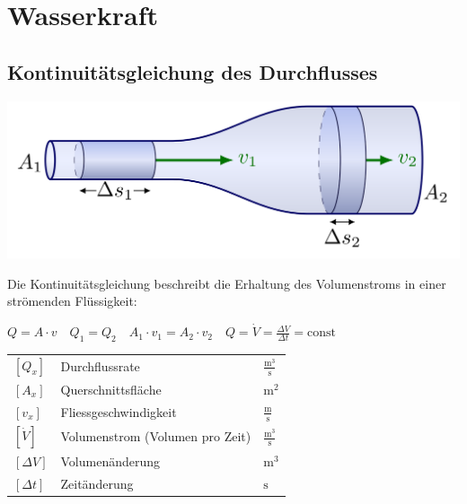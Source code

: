 \newpage
\section{Wasserkraft}


\subsection{Kontinuitätsgleichung des Durchflusses}
\begin{center}
    \includegraphics[width=0.9\columnwidth, align=c]{images/Kontinuitaet.png}
\end{center}

Die Kontinuitätsgleichung beschreibt die Erhaltung des Volumenstroms in einer strömenden Flüssigkeit:

\vspace{0.15cm}

$
\boxed{
    Q = A \cdot v 
} 
\quad
\boxed{
    Q_1 = Q_2 
} 
\quad
\boxed{
    A_1 \cdot v_1 = A_2 \cdot v_2
}
\quad
\boxed{
    Q = \dot{V} = \frac{\Delta V}{\Delta t} = \text{const} 
} 
$

\vspace{0.15cm}

\renewcommand{\arraystretch}{1.2} %
\begin{tabular}{@{} l p{6cm} l @{}}
    $[Q_x]$        & Durchflussrate                     \dotfill & $\mathrm{\frac{m^3}{s}}$ \\
    $[A_x]$        & Querschnittsfläche                 \dotfill & $\mathrm{m^2}$ \\
    $[v_x]$        & Fliessgeschwindigkeit              \dotfill & $\mathrm{\frac{m}{s}}$ \\
    $[\dot{V}]$    & Volumenstrom (Volumen pro Zeit)    \dotfill & $\mathrm{\frac{m^3}{s}}$ \\
    $[\Delta V]$   & Volumenänderung                    \dotfill & $\mathrm{m^3}$ \\
    $[\Delta t]$   & Zeitänderung                       \dotfill & $\mathrm{s}$ \\
\end{tabular}



